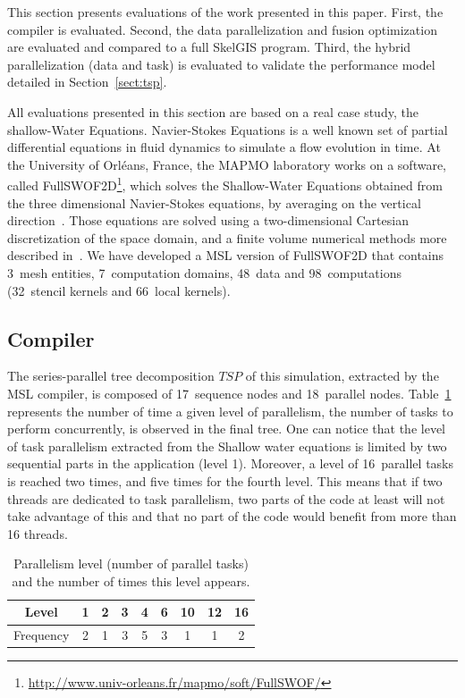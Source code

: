 This section presents evaluations of the work presented in this paper. First, the compiler is evaluated. Second, the data parallelization and fusion optimization are evaluated and compared to a full SkelGIS program. Third, the hybrid parallelization (data and task) is evaluated to validate the performance model detailed in Section~\ref{sect:tsp}.

All evaluations presented in this section are based on a real case study, the shallow-Water Equations. Navier-Stokes Equations is a well known set of partial differential equations in fluid dynamics to simulate a flow evolution in time. At the University of Orl\'eans, France, the MAPMO laboratory works on a software, called FullSWOF2D\footnote{\url{http://www.univ-orleans.fr/mapmo/soft/FullSWOF/}}, which solves the Shallow-Water Equations obtained from the three dimensional Navier-Stokes equations, by averaging on the vertical direction~\cite{Ferrari2004}. Those equations are solved using a two-dimensional Cartesian discretization of the space domain, and a finite volume numerical methods more described in~\cite{CPE:CPE3494}. We have developed a MSL version of FullSWOF2D that contains 3~mesh entities, 7~computation domains, 48~data and 98~computations (32~stencil kernels and 66~local kernels).

\subsection{Compiler}

The series-parallel tree decomposition $TSP$ of this simulation, extracted by the MSL compiler, is composed of 17~sequence nodes and 18~parallel nodes. Table~\ref{fig:freq} represents the number of time a given level of parallelism, \ie the number of tasks to perform concurrently, is observed in the final tree. One can notice that the level of task parallelism extracted from the Shallow water equations is limited by two sequential parts in the application (level 1). Moreover, a level of 16~parallel tasks is reached two times, and five times for the fourth level.
This means that if two threads are dedicated to task parallelism, two parts of the code at least will not take advantage of this and that no part of the code would benefit from more than 16 threads.

\begin{table}[!h]
 \begin{center}
 \begin{tabular}{|c|c|c|c|c|c|c|c|c|}
    \hline 
   Level & 1 & 2 & 3 & 4 & 6 & 10 & 12 & 16\\
   \hline
   Frequency & 2 & 1 & 3 & 5 & 3 & 1 & 1 & 2\\
   \hline
 \end{tabular}
\caption{Parallelism level (number of parallel tasks) and the number of times this level appears.}
\label{fig:freq}
 \end{center}
\end{table}

